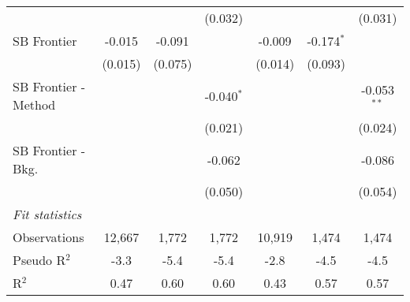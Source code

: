 \begin{tabular}{lcccccc}
                        &         &             & (0.032)      &              &              & (0.031)\\   
   SB Frontier          & -0.015  & -0.091      &              & -0.009       & -0.174$^{*}$ &   \\   
                        & (0.015) & (0.075)     &              & (0.014)      & (0.093)      &   \\   
   SB Frontier - Method &         &             & -0.040$^{*}$ &              &              & -0.053$^{**}$\\   
                        &         &             & (0.021)      &              &              & (0.024)\\   
   SB Frontier - Bkg.   &         &             & -0.062       &              &              & -0.086\\   
                        &         &             & (0.050)      &              &              & (0.054)\\   
   \midrule
   \emph{Fit statistics}\\
   Observations         & 12,667  & 1,772       & 1,772        & 10,919       & 1,474        & 1,474\\  
   Pseudo R$^2$         & -3.3    & -5.4        & -5.4         & -2.8         & -4.5         & -4.5\\  
   R$^2$                & 0.47    & 0.60        & 0.60         & 0.43         & 0.57         & 0.57\\  
   

\end{tabular}
